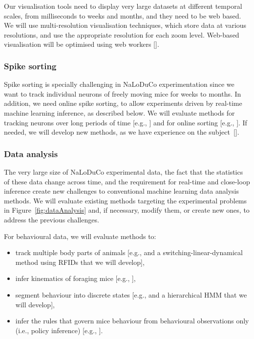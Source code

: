 Our visualisation tools
need to display very large datasets at different temporal scales, from
milliseconds to weeks and months, and they need to be web based.
%
We will use multi-resolution visualisation techniques, which store data at
various resolutions, and use the appropriate resolution for each zoom level.
%
Web-based visualisation will be optimised using web workers
[\cite{webWorkers}].

\subsubsection{Spike sorting}

Spike sorting is specially challenging in NaLoDuCo experimentation since we
want to track individual neurons of freely moving mice for weeks to months.
%
In addition, we need online spike sorting, to allow experiments driven
by real-time machine learning inference, as described below.
%
We will evaluate methods for tracking neurons over long periods of time
[e.g., \cite{yuanEtAl24,vanBeestEtAl24}] and for online sorting
[e.g., \cite{rutishauserEtAl06,santhanamEtAl04}]. If needed, we will develop
new methods, as we have experience on the subject~[\cite{sahani99}].

\subsubsection{Data analysis}

The very large size of NaLoDuCo experimental data, the fact that the statistics
of these data change across time, and the requirement for real-time and
close-loop inference create new challenges to conventional machine learning
data analysis methods.
%
We will evaluate existing methods targeting the experimental problems
in Figure~\ref{fig:dataAnalysis} and, if necessary, modify them, or create new
ones, to address the previous challenges.

For behavioural data, we will evaluate methods to:

\begin{itemize}

    \item track multiple body parts of
animals [e.g., \cite{mathisEtAl18,pereiraEtAl22,bidermanEtAl24} and a switching-linear-dynamical method using RFIDs that
we will develop],

    \item infer kinematics of foraging mice [e.g.,
        \cite{ldspython,challaEtAl11}],

    \item segment behaviour into discrete states [e.g., \cite{wiltschkoEtAl15,hsuAndYttri21} and a hierarchical HMM
that we will develop],

    \item infer the rules that govern mice behaviour from behavioural observations
        only (i.e., policy inference) [e.g., \cite{ziebartEtAl08,zhuEtAl23}].

\end{itemize}

